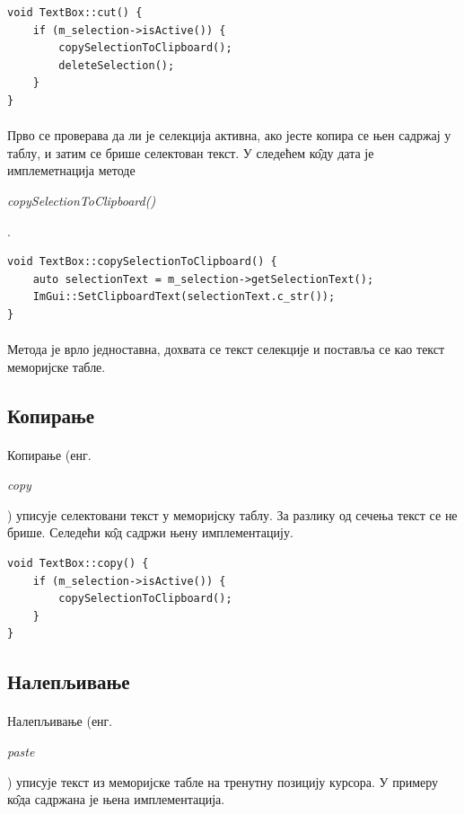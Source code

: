 \documentclass[12pt,oneside]{memoir}
\begin{document}
\begin{verbatim}
void TextBox::cut() {
	if (m_selection->isActive()) {
		copySelectionToClipboard();
		deleteSelection();
	}
}
\end{verbatim}

\paragraph{}
Прво се проверава да ли је селекција активна, ако јесте копира се њен садржај у
таблу, и затим се брише селектован текст. У следећем к\^{о}ду дата је имплеметнација
методе \begin{latinica}\textit{copySelectionToClipboard()}\end{latinica}.

\begin{verbatim}
void TextBox::copySelectionToClipboard() {
	auto selectionText = m_selection->getSelectionText();
	ImGui::SetClipboardText(selectionText.c_str());
}
\end{verbatim}

\paragraph{}
Метода је врло једноставна, дохвата се текст селекције и поставља се као
текст меморијске табле.

\subsection{Копирање}
\paragraph{}
Копирање (енг. \begin{latinica}\textit{copy}\end{latinica}) уписује селектовани
текст у меморијску таблу. За разлику од сечења текст се не брише. Селедећи к\^{о}д
садржи њену имплементацију.

\begin{verbatim}
void TextBox::copy() {
	if (m_selection->isActive()) {
		copySelectionToClipboard();
	}
}
\end{verbatim}

\subsection{Налепљивање}
\paragraph{}
Налепљивање (енг. \begin{latinica}\textit{paste}\end{latinica}) уписује текст из
меморијске табле на тренутну позицију курсора. У примеру к\^{о}да садржана је њена
имплементација.
\end{document}

